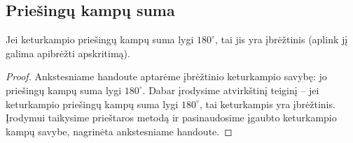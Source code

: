 \documentclass[11pt,a4paper]{scrartcl}
\begin{document}
\subsection{Priešingų kampų suma}
\begin{proposition}
Jei keturkampio priešingų kampų suma lygi $180^\circ$, tai jis yra įbrėžtinis (aplink jį galima apibrėžti apskritimą).
\end{proposition}
\begin{proof}
Ankstesniame handoute aptarėme įbrėžtinio keturkampio savybę: jo priešingų kampų suma lygi $180^\circ$. Dabar įrodysime atvirkštinį teiginį – jei keturkampio priešingų kampų suma lygi $180^\circ$, tai keturkampis yra įbrėžtinis. Įrodymui taikysime prieštaros metodą ir pasinaudosime įgaubto keturkampio kampų savybe, nagrinėta ankstesniame handoute.


\end{proof}
\end{document}
